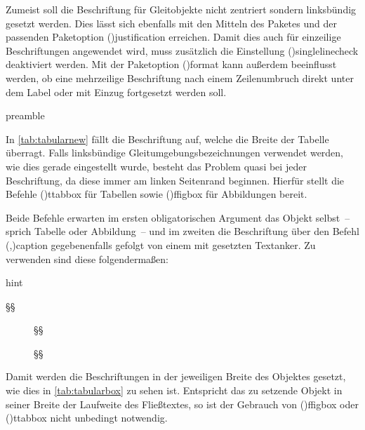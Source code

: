 \documentclass[%
  english,ngerman,%
  cdgeometry=no,DIV=12,%
  cd=false,cdfont=false,cdtitle=true,%
  headings=normal,%
  automark,%
  listof=toc,%
]{tudscrartcl}
\begin{document}
Zumeist soll die Beschriftung für Gleitobjekte nicht zentriert sondern 
linksbündig gesetzt werden. Dies lässt sich ebenfalls mit den Mitteln des 
Paketes  und der passenden Paketoption 
\Option(){justification} erreichen. Damit dies auch für 
einzeilige Beschriftungen angewendet wird, muss zusätzlich die Einstellung 
\Option(){singlelinecheck} deaktiviert werden. Mit der 
Paketoption \Option(){format} kann außerdem beeinflusst 
werden, ob eine mehrzeilige Beschriftung nach einem Zeilenumbruch direkt unter 
dem Label oder mit Einzug fortgesetzt werden soll.
%
\begin{Code}[input]{preamble}
\captionsetup{singlelinecheck=off,format=hang,justification=raggedright}
\end{Code}

In \autoref{tab:tabularnew} fällt die Beschriftung auf, welche die Breite der 
Tabelle überragt. Falls linksbündige Gleitumgebungsbezeichnungen verwendet 
werden, wie dies gerade eingestellt wurde, besteht das Problem quasi bei jeder 
Beschriftung, da diese immer am linken Seitenrand beginnen. Hierfür stellt 
 die Befehle \Macro(){ttabbox} für Tabellen 
sowie \Macro(){ffigbox} für Abbildungen bereit. 

Beide Befehle erwarten im ersten obligatorischen Argument das Objekt selbst~-- 
sprich Tabelle oder Abbildung~-- und im zweiten die Beschriftung über den 
Befehl \Macro(,){caption} gegebenenfalls 
gefolgt von einem mit  gesetzten Textanker. Zu verwenden sind 
diese folgendermaßen:
%
\begin{Code}{hint}
\begin{table}
\ttabbox
  §§
  {\caption{§§\label{§\PName{Tabellenlabel}§}}}
\end{table}
\begin{figure}
\ffigbox
  §§
  {\caption{§§\label{§\PName{Abbildungslabel}§}}}
\end{figure}
\end{Code}

Damit werden die Beschriftungen in der jeweiligen Breite des Objektes gesetzt, 
wie dies in \autoref{tab:tabularbox} zu sehen ist. Entspricht das zu setzende 
Objekt in seiner Breite der Laufweite des Fließtextes, so ist der Gebrauch von 
\Macro(){ffigbox} oder \Macro(){ttabbox}
nicht unbedingt notwendig.
\end{document}
